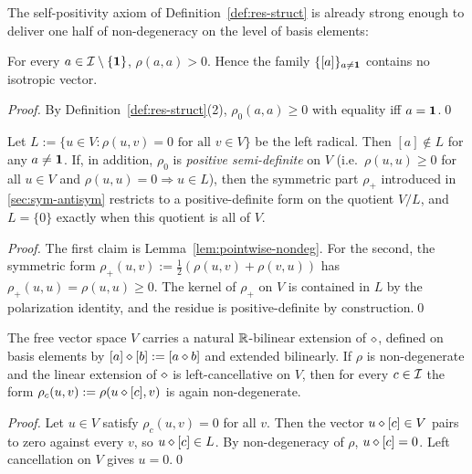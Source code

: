 The self-positivity axiom of Definition~\ref{def:res-struct} is already
strong enough to deliver one half of non-degeneracy on the level of basis
elements:

\begin{lemma}\label{lem:pointwise-nondeg}
For every $a\in\mathcal{I}\setminus\{\mathbf{1}\}$, $\rho(a,a)>0$. Hence the family
$\{[a]\}_{a\ne\mathbf{1}}$ contains no isotropic vector.
\end{lemma}

\begin{proof}
By Definition~\ref{def:res-struct}(2), $\rho_0(a,a)\ge 0$ with equality iff
$a=\mathbf{1}$.\qed
\end{proof}

\begin{theorem}\label{thm:nondeg}
Let $L:=\{u\in V:\rho(u,v)=0\text{ for all }v\in V\}$ be the left radical.
Then $[a]\notin L$ for any $a\ne\mathbf{1}$. If, in addition, $\rho_0$ is
\emph{positive semi-definite} on $V$ (i.e.\ $\rho(u,u)\ge 0$ for all $u\in
V$ and $\rho(u,u)=0\Rightarrow u\in L$), then the symmetric part $\rho_+$
introduced in \cref{sec:sym-antisym} restricts to a positive-definite form
on the quotient $V/L$, and $L=\{0\}$ exactly when this quotient is all of
$V$.
\end{theorem}
\begin{proof}
The first claim is Lemma~\ref{lem:pointwise-nondeg}. For the second, the
symmetric form $\rho_+(u,v):=\tfrac12(\rho(u,v)+\rho(v,u))$ has
$\rho_+(u,u)=\rho(u,u)\ge 0$. The kernel of $\rho_+$ on $V$ is contained in
$L$ by the polarization identity, and the residue is positive-definite by
construction.\qed
\end{proof}

\begin{theorem}\label{thm:nondeg-comp}
The free vector space $V$ carries a natural $\mathbb{R}$-bilinear extension of
$\mathbin{\diamond}$, defined on basis elements by $[a]\mathbin{\diamond}[b]:=[a\mathbin{\diamond} b]$ and
extended bilinearly. If $\rho$ is non-degenerate and the linear extension
of $\mathbin{\diamond}$ is left-cancellative on $V$, then for every $c\in\mathcal{I}$ the
form $\rho_c(u,v):=\rho(u\mathbin{\diamond} [c],v)$ is again non-degenerate.
\end{theorem}

\begin{proof}
Let $u\in V$ satisfy $\rho_c(u,v)=0$ for all $v$. Then the vector
$u\mathbin{\diamond}[c]\in V$ pairs to zero against every $v$, so $u\mathbin{\diamond}[c]\in L$.
By non-degeneracy of $\rho$, $u\mathbin{\diamond}[c]=0$. Left cancellation on $V$
gives $u=0$.\qed
\end{proof}

